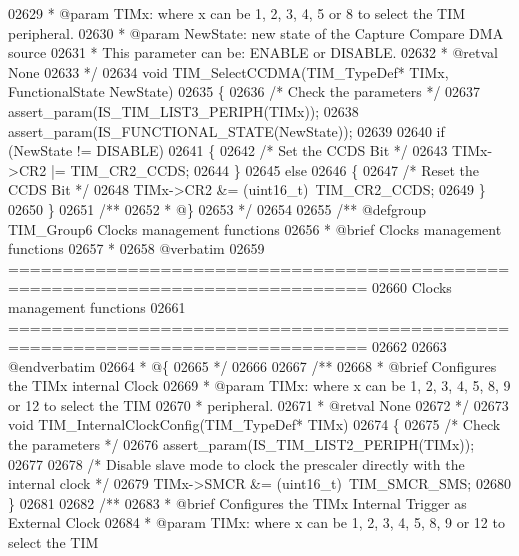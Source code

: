 \begin{DoxyCode}
02629 \textcolor{comment}{  * @param  TIMx: where x can be  1, 2, 3, 4, 5 or 8 to select the TIM peripheral.}
02630 \textcolor{comment}{  * @param  NewState: new state of the Capture Compare DMA source}
02631 \textcolor{comment}{  *          This parameter can be: ENABLE or DISABLE.}
02632 \textcolor{comment}{  * @retval None}
02633 \textcolor{comment}{  */}
02634 \textcolor{keywordtype}{void} TIM_SelectCCDMA(TIM\_TypeDef* TIMx, FunctionalState NewState)
02635 \{
02636   \textcolor{comment}{/* Check the parameters */}
02637   assert_param(IS\_TIM\_LIST3\_PERIPH(TIMx));
02638   assert_param(IS\_FUNCTIONAL\_STATE(NewState));
02639 
02640   \textcolor{keywordflow}{if} (NewState != DISABLE)
02641   \{
02642     \textcolor{comment}{/* Set the CCDS Bit */}
02643     TIMx->CR2 |= TIM_CR2_CCDS;
02644   \}
02645   \textcolor{keywordflow}{else}
02646   \{
02647     \textcolor{comment}{/* Reset the CCDS Bit */}
02648     TIMx->CR2 &= (uint16\_t)~TIM_CR2_CCDS;
02649   \}
02650 \}
02651 \textcolor{comment}{/**}
02652 \textcolor{comment}{  * @\}}
02653 \textcolor{comment}{  */}
02654 
02655 \textcolor{comment}{/** @defgroup TIM\_Group6 Clocks management functions}
02656 \textcolor{comment}{ *  @brief    Clocks management functions}
02657 \textcolor{comment}{ *}
02658 \textcolor{comment}{@verbatim   }
02659 \textcolor{comment}{ ===============================================================================}
02660 \textcolor{comment}{                         Clocks management functions}
02661 \textcolor{comment}{ ===============================================================================  }
02662 \textcolor{comment}{}
02663 \textcolor{comment}{@endverbatim}
02664 \textcolor{comment}{  * @\{}
02665 \textcolor{comment}{  */}
02666 
02667 \textcolor{comment}{/**}
02668 \textcolor{comment}{  * @brief  Configures the TIMx internal Clock}
02669 \textcolor{comment}{  * @param  TIMx: where x can be 1, 2, 3, 4, 5, 8, 9 or 12 to select the TIM }
02670 \textcolor{comment}{  *         peripheral.}
02671 \textcolor{comment}{  * @retval None}
02672 \textcolor{comment}{  */}
02673 \textcolor{keywordtype}{void} TIM_InternalClockConfig(TIM\_TypeDef* TIMx)
02674 \{
02675   \textcolor{comment}{/* Check the parameters */}
02676   assert_param(IS\_TIM\_LIST2\_PERIPH(TIMx));
02677 
02678   \textcolor{comment}{/* Disable slave mode to clock the prescaler directly with the internal clock */}
02679   TIMx->SMCR &=  (uint16\_t)~TIM_SMCR_SMS;
02680 \}
02681 
02682 \textcolor{comment}{/**}
02683 \textcolor{comment}{  * @brief  Configures the TIMx Internal Trigger as External Clock}
02684 \textcolor{comment}{  * @param  TIMx: where x can be 1, 2, 3, 4, 5, 8, 9 or 12 to select the TIM }

\end{DoxyCode}
